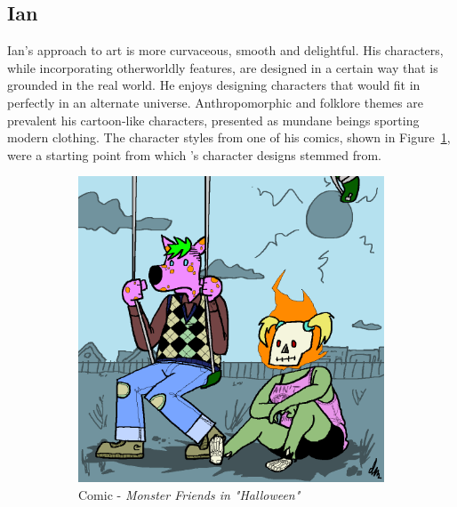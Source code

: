 \clearpage
\subsection{Ian}
Ian's approach to art is more curvaceous, smooth and delightful. His characters, while incorporating otherworldly features, are designed in a certain way that is grounded in the real world. He enjoys designing characters that would fit in perfectly in an alternate universe. Anthropomorphic and folklore themes are prevalent his cartoon-like characters, presented as mundane beings sporting modern clothing. The character styles from one of his comics, shown in Figure~\ref{fig:i1}, were a starting point from which \ourgame{}'s character designs stemmed from.

\begin{figure}[H]
  \centering\begin{subfigure}{.4\textwidth}
    \centering
    \includegraphics[width=.9\linewidth]{images/ref_IAN01}
  	\caption{Comic - \textit{Monster Friends in "Halloween"}}
  \label{fig:i1}
  \end{subfigure}
  \begin{subfigure}{.35\textwidth}
    \centering

\end{subfigure}
\end{figure}
